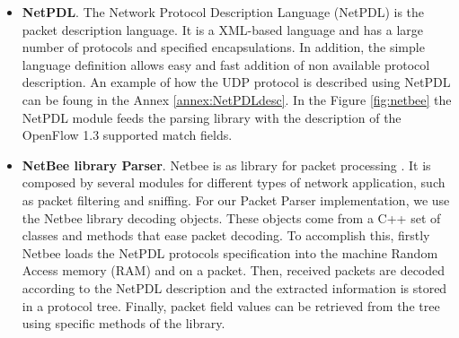     \begin{itemize}
    \item \textbf{NetPDL}. The Network Protocol Description Language (NetPDL)\cite{Risso:2006:NEX:1141112.1141119} is the packet description language. It is a XML-based language and has a large number of protocols and specified encapsulations. In addition, the simple language definition allows easy and fast addition of non available protocol description. An example of how the UDP protocol is described using NetPDL can be foung in the Annex \ref{annex:NetPDLdesc}. In the Figure \ref{fig:netbee} the NetPDL module feeds the parsing library with the description of the OpenFlow 1.3 supported match fields.
    
    \item \textbf{NetBee library Parser}. Netbee is as library for packet processing \cite{nbee}. It is composed by several modules for different types of network application, such as packet filtering and sniffing. For our Packet Parser implementation, we use the Netbee library decoding objects. These objects come from a C++ set of classes and methods that ease packet decoding. To accomplish this, firstly Netbee loads the NetPDL protocols specification into the machine Random Access memory (RAM) and on a packet. Then, received packets are decoded according to the NetPDL description and the extracted information is stored in a protocol tree. Finally, packet field values can be retrieved from the tree using specific methods of the library. 
    

\end{itemize}
